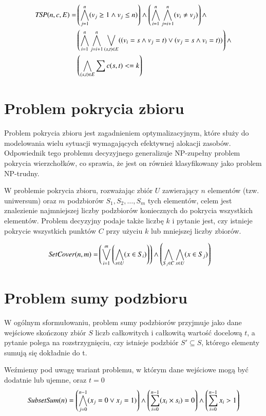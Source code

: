 \begin{align*}
	{\mathit{TSP}}(n, c, E) = &\left( \bigwedge_{j=1}^{n} (v_j \geq 1 \land v_j \leq n) \right) \land 
	\left( \bigwedge_{i=1}^{n} \bigwedge_{j=i+1}^{n} (v_i \neq v_j) \right) \land \\
	&\left( \bigwedge_{i=1}^{n} \bigwedge_{j=i+1}^{n} \bigvee_{(s,t) \in E} ((v_i = s \land v_j = t) \lor (v_j = s \land v_i = t)) \right)	\land \\
	&\left( \bigwedge_{(s,t) \in E} \sum c(s,t) <= k \right)
\end{align*}


\section{Problem pokrycia zbioru}
Problem pokrycia zbioru jest zagadnieniem optymalizacyjnym, które służy do modelowania wielu sytuacji wymagających efektywnej alokacji zasobów. Odpowiednik tego problemu decyzyjnego generalizuje NP-zupełny problem pokrycia wierzchołków, co sprawia, że jest on również klasyfikowany jako problem NP-trudny.

W problemie pokrycia zbioru, rozważając zbiór \(U\) zawierający \(n\) elementów (tzw. uniwersum) oraz \(m\) podzbiorów $S_1, S_2, …, S_m$ tych elementów, celem jest znalezienie najmniejszej liczby podzbiorów koniecznych do pokrycia wszystkich elementów. Problem decyzyjny podaje także liczbę \(k\) i pytanie jest, czy istnieje pokrycie wszystkich punktów \(C\) przy użyciu \(k\) lub mniejszej liczby zbiorów.

\begin{align*}
	{\mathit{SetCover}}(n, m) = &\left( \bigvee_{i=1}^{m} \left( \bigwedge_{x\in U} (x \in S_i) \right) \right) \land 
	\left( \bigwedge_{S_j\in C} \bigwedge_{x\in U} (x \in S_j) \right)
\end{align*}


\section{Problem sumy podzbioru}


W ogólnym sformułowaniu, problem sumy podzbiorów przyjmuje jako dane wejściowe skończony zbiór \(S\) liczb całkowitych i całkowitą wartość docelową \(t\), a pytanie polega na rozstrzygnięciu, czy istnieje podzbiór $S' \subseteq S$, którego elementy sumują się dokładnie do t. 

Weźmiemy pod uwagę wariant problemu, w którym dane wejściowe mogą być dodatnie lub ujemne, oraz \(t = 0\)
\begin{align*}
	{\mathit{SubsetSum}}(n) = \left( \bigwedge_{j=0}^{n-1} (x_j = 0 \lor x_j = 1) \right) \land 
	\left( \sum_{i=0}^{n-1} (x_i \times s_i) = 0 \right) \land 
	\left( \sum_{i=0}^{n-1} x_i > 1 \right)
\end{align*}


